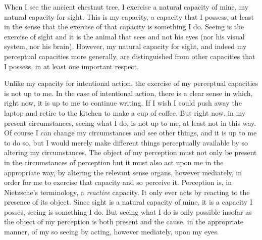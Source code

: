 \documentclass[12pt]{article}
\begin{document}
When I see the ancient chestnut tree, I exercise a natural capacity of mine, my natural capacity for sight. This is my capacity, a capacity that I possess, at least in the sense that the exercise of that capacity is something I do. Seeing is the exercise of sight and it is the animal that sees and not his eyes (nor his visual system, nor his brain). However, my natural capacity for sight, and indeed my perceptual capacities more generally, are distinguished from other capacities that I possess, in at least one important respect. 

Unlike my capacity for intentional action, the exercise of my perceptual capacities is not up to me. In the case of intentional action, there is a clear sense in which, right now, it is up to me to continue writing. If I wish I could push away the laptop and retire to the kitchen to make a cup of coffee. But right now, in my present circumstances, seeing what I do, is not up to me, at least not in this way. Of course I can change my circumstances and see other things, and it is up to me to do so, but I would merely make different things perceptually available by so altering my circumstances. The object of my perception must not only be present in the circumstances of perception but it must also act upon me in the appropriate way, by altering the relevant sense organs, however mediately, in order for me to exercise that capacity and so perceive it. Perception is, in Nietzsche's terminology, a \emph{reactive} capacity. It only ever acts by reacting to the presence of its object. Since sight is a natural capacity of mine, it is a capacity I posses, seeing is something I do. But seeing what I do is only possible insofar as the object of my perception is both present and the cause, in the appropriate manner, of my so seeing by acting, however mediately, upon my eyes.



\end{document}
